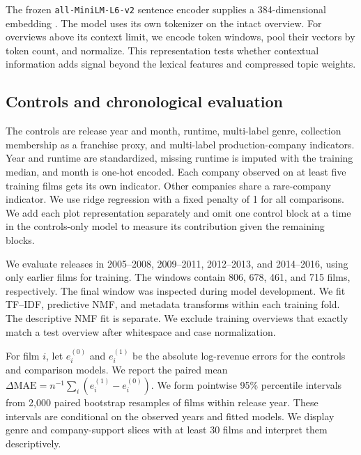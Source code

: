 The frozen \texttt{all-MiniLM-L6-v2} sentence encoder supplies a
384-dimensional embedding \cite{minilm,reimers2019}.
The model uses its own tokenizer on the intact overview. For overviews above
its context limit, we encode token windows, pool their vectors by token count,
and normalize. This representation tests whether contextual information adds
signal beyond the lexical features and compressed topic weights.

\subsection{Controls and chronological evaluation}

The controls are release year and month, runtime, multi-label genre, collection
membership as a franchise proxy, and multi-label production-company indicators.
Year and runtime are standardized, missing runtime is imputed with the training
median, and month is one-hot encoded. Each company observed on at least five
training films gets its own indicator. Other companies share a rare-company
indicator. We use ridge regression with a fixed penalty of 1 for all
comparisons. We add each plot representation separately and omit one control
block at a time in the controls-only model to measure its contribution given
the remaining blocks.

We evaluate releases in 2005--2008, 2009--2011, 2012--2013, and 2014--2016,
using only earlier films for training. The windows contain 806, 678, 461, and
715 films, respectively. The final window was inspected during model
development. We fit TF--IDF, predictive NMF, and metadata transforms within
each training fold. The descriptive NMF fit is separate. We exclude training
overviews that exactly match a test overview after whitespace and case
normalization.

For film $i$, let $e_i^{(0)}$ and $e_i^{(1)}$ be the absolute log-revenue
errors for the controls and comparison models. We report the paired mean
$\Delta\mathrm{MAE} = n^{-1}\sum_i (e_i^{(1)}-e_i^{(0)})$.
We form pointwise 95\% percentile intervals from 2,000 paired bootstrap
resamples of films within release year. These intervals are conditional on
the observed years and fitted models. We display genre and company-support
slices with at least 30 films and interpret them descriptively.
